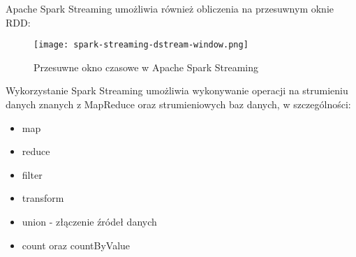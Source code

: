 Apache Spark Streaming umożliwia również obliczenia na przesuwnym oknie RDD:

\begin{figure}[h!]
  \centering
    \texttt{[image: spark-streaming-dstream-window.png]}
  \caption{Przesuwne okno czasowe w Apache Spark Streaming}
  \label{fig:spark-streaming-dstream-window}
\end{figure}

Wykorzystanie Spark Streaming umożliwia wykonywanie operacji na strumieniu danych znanych z MapReduce oraz strumieniowych baz danych, w szczególności:

\begin{itemize}[noitemsep]
  \item map
  \item reduce
  \item filter
  \item transform
  \item union - złączenie źródeł danych
  \item count oraz countByValue
\end{itemize}
